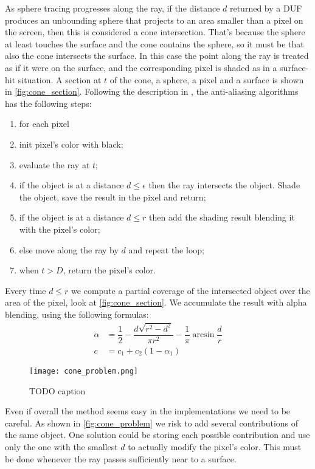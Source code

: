 As sphere tracing progresses along the ray, if the distance $d$ returned by a DUF produces an unbounding sphere that projects to an area smaller than a pixel on the screen, then this is considered a cone intersection.
That's because the sphere at least touches the surface and the cone contains the sphere, so it must be that also the cone intersects the surface.
In this case the point along the ray is treated as if it were on the surface, and the corresponding pixel is shaded as in a surface-hit situation.
A section at $t$ of the cone, a sphere, a pixel and a surface is shown in \autoref{fig:cone_section}.
Following the description in \cite{scratch_sdf}, the anti-aliasing algorithms has the following steps:
\begin{enumerate}
  \item for each pixel
  \item init pixel's color with black;
  \item evaluate the ray at $t$;
  \item if the object is at a distance $d \leq \epsilon$ then the ray intersects the object.
    Shade the object, save the result in the pixel and return;
  \item if the object is at a distance $d \leq r$ then add the shading result blending it with the pixel's color;
  \item else move along the ray by $d$ and repeat the loop;
  \item when $t > D$, return the pixel's color.
\end{enumerate}
Every time $d \leq r$ we compute a partial coverage of the intersected object over the area of the pixel, look at \autoref{fig:cone_section}.
We accumulate the result with alpha blending, using the following formulas:
\begin{align*}
  \alpha &= \dfrac {1}{2} - \dfrac {d \sqrt{r^2 - d^2}} {\pi r^2} - \dfrac{1}{\pi}\arcsin \dfrac {d}{r}\\
  c &= c_1 + c_2 (1 - \alpha_1)
\end{align*}
\begin{figure}[!htb]
  \centering
  \texttt{[image: cone\_problem.png]}
  \caption{TODO caption}
  \label{fig:cone_problem}
\end{figure}
Even if overall the method seems easy in the implementations we need to be careful.
As shown in \autoref{fig:cone_problem} we risk to add several contributions of the same object.
One solution could be storing each possible contribution and use only the one with the smallest $d$ to actually modify the pixel's color.
This must be done whenever the ray passes sufficiently near to a surface.

